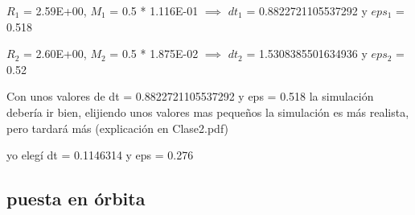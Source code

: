 \documentclass[12pt]{article} %
\renewcommand{\=}[1]{\stackrel{#1}{=}} %
\theoremstyle{definition}
\theoremstyle{remark}
\begin{document}
\begin{description}
\begin{description}
\begin{verbatim}
\end{verbatim}

\normalsize
\item $R_1$ = 2.59E+00, $M_1$ = 0.5 * 1.116E-01 $\implies$ $dt_1$ = 0.8822721105537292 y $eps_1$ = 0.518
\item $R_2$ = 2.60E+00, $M_2$ = 0.5 * 1.875E-02 $\implies$ $dt_2$ = 1.5308385501634936 y $eps_2$ = 0.52

\item Con unos valores de dt = 0.8822721105537292 y eps = 0.518 la simulación debería ir bien, elijiendo unos valores mas pequeños la simulación es más realista, pero tardará más (explicación en Clase2.pdf)
\item yo elegí dt = 0.1146314 y eps = 0.276

\end{description}

\end{description}

\subsection*{puesta en órbita}
\end{document}
